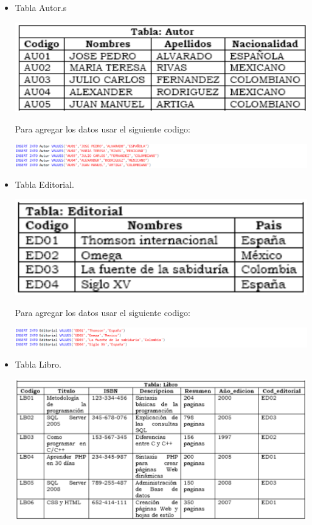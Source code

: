 \documentclass[12pt,letterpaper]{article}
\newcommand\tab[1][1cm]{\hspace*{#1}}
\begin{document}
\begin{enumerate}[\tab 1.]
\begin{itemize}
            \item Tabla Autor.s
            \begin{center}
                \includegraphics[width=13cm]{./img/img2.png}
            \end{center}
            Para agregar los datos usar el siguiente codigo:
            \begin{center}
                \includegraphics[width=13cm]{./img/img2.1.png}
            \end{center}
            \item Tabla Editorial.
            \begin{center}
                \includegraphics[width=13cm]{./img/img3.png}
            \end{center}
            Para agregar los datos usar el siguiente codigo:
            \begin{center}
                \includegraphics[width=13cm]{./img/img3.1.png}
            \end{center}
            \item Tabla Libro.
            \begin{center}
                \includegraphics[width=13cm]{./img/img4.png}

\end{center}
\end{itemize}
\end{enumerate}
\end{document}
